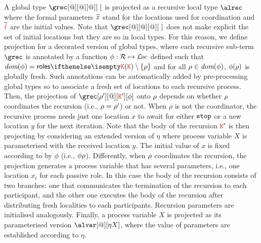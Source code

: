  A global type $\grec[@][@][@][\ ]$ is projected as a recursive 
local type $\alrec$ where the formal parameters $\seq x$ stand 
for the locations used for coordination and 
$\seq \alocvar$ are the initial values. 
%
Note that $\grec[@][@][@][\ ]$ does not make explicit the set of 
initial locations but they are so in local types. 
%
For this reason, we
define projection for a decorated version of global types, where 
each recursive sub-term $\grec$ is annotated by a function
$\aphi:\roleset \mapsto \locset$
defined such that $\dom\aphi = \roles\aK\setminus\{\arole\}$ and 
 for all $\arole\in\dom\aphi$,  $\aphi(\arole)$ is globally fresh.
%
Such annotations can be  automatically added by pre-processing  
global types so to associate a fresh set of locations to each recursive
process. 
%
Then, the projection of 
 $\grec[\arole'][@][\aK'][\aphi]$ onto $\arole$ depends on whether $\arole$
 coordinates the recursion  (i.e., $\arole = \arole'$) or not. 
%
When $\rho$ is not 
 the coordinator, the recursive process needs just one location $x$ to await for 
 either $\asort[stop]$ or a new location $y$ for the next iteration.
%
Note 
 that the body of the recursion $\aK'$ is then projecting by considering an extended 
 version of $\eta$ where process variable $X$ is parameterised with the received 
 location $y$. 
%
The initial value of  $x$ is fixed  according to  
 by $\phi$  (i.e., $\phi\arole$). 
%
Differently, when $\arole$ coordinates the recursion, the projection generates 
a process variable that has several parameters, i.e., one location $x_i$ for 
each passive role. 
%
In this case the body of the recursion consists of two 
branches: one that communicates the termination of the recursion to 
each participant, and the other one executes the body of the recursion after
distributing fresh localities to each participants. 
%
Recursion parameters are
initialised analogously. 
%
Finally, a process variable $X$ is projected as its parameterised version 
$\alvar [@][\eta X]$, where the value of parameters are established according 
to $\eta$.



